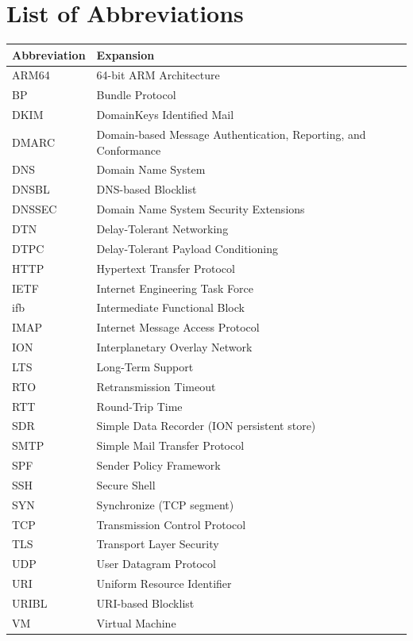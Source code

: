 \documentclass[a4paper,oneside,12pt]{book}
\begin{document}
\chapter*{List of Abbreviations}
\begin{singlespace}
\begin{tabular}{ll}
\toprule
\textbf{Abbreviation} & \textbf{Expansion} \\
\midrule
ARM64  & 64-bit ARM Architecture \\
BP     & Bundle Protocol \\
DKIM   & DomainKeys Identified Mail \\
DMARC  & Domain-based Message Authentication, Reporting, and Conformance \\
DNS    & Domain Name System \\
DNSBL  & DNS-based Blocklist \\
DNSSEC & Domain Name System Security Extensions \\
DTN    & Delay-Tolerant Networking \\
DTPC   & Delay-Tolerant Payload Conditioning \\
HTTP   & Hypertext Transfer Protocol \\
IETF   & Internet Engineering Task Force \\
ifb    & Intermediate Functional Block \\
IMAP   & Internet Message Access Protocol \\
ION    & Interplanetary Overlay Network \\
LTS    & Long-Term Support \\
RTO    & Retransmission Timeout \\
RTT    & Round-Trip Time \\
SDR    & Simple Data Recorder (ION persistent store) \\
SMTP   & Simple Mail Transfer Protocol \\
SPF    & Sender Policy Framework \\
SSH    & Secure Shell \\
SYN    & Synchronize (TCP segment) \\
TCP    & Transmission Control Protocol \\
TLS    & Transport Layer Security \\
UDP    & User Datagram Protocol \\
URI    & Uniform Resource Identifier \\
URIBL  & URI-based Blocklist \\
VM     & Virtual Machine \\
\bottomrule
\end{tabular}
\end{singlespace}
\end{document}
